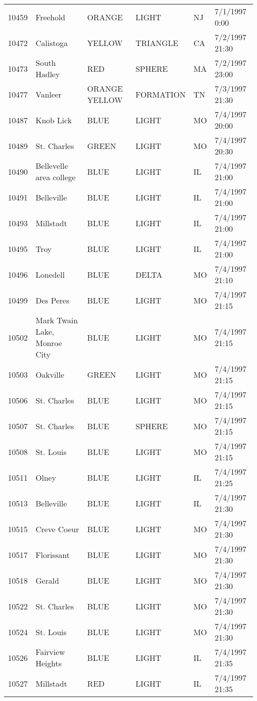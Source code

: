 \begin{tabular}{llllll}
10459 & Freehold & ORANGE & LIGHT & NJ & 7/1/1997 0:00 \\
10472 & Calistoga & YELLOW & TRIANGLE & CA & 7/2/1997 21:30 \\
10473 & South Hadley & RED & SPHERE & MA & 7/2/1997 23:00 \\
10477 & Vanleer & ORANGE YELLOW & FORMATION & TN & 7/3/1997 21:30 \\
10487 & Knob Lick & BLUE & LIGHT & MO & 7/4/1997 20:00 \\
10489 & St. Charles & GREEN & LIGHT & MO & 7/4/1997 20:30 \\
10490 & Bellevelle area college & BLUE & LIGHT & IL & 7/4/1997 21:00 \\
10491 & Belleville & BLUE & LIGHT & IL & 7/4/1997 21:00 \\
10493 & Millstadt & BLUE & LIGHT & IL & 7/4/1997 21:00 \\
10495 & Troy & BLUE & LIGHT & IL & 7/4/1997 21:00 \\
10496 & Lonedell & BLUE & DELTA & MO & 7/4/1997 21:10 \\
10499 & Des Peres & BLUE & LIGHT & MO & 7/4/1997 21:15 \\
10502 & Mark Twain Lake, Monroe City & BLUE & LIGHT & MO & 7/4/1997 21:15 \\
10503 & Oakville & GREEN & LIGHT & MO & 7/4/1997 21:15 \\
10506 & St. Charles & BLUE & LIGHT & MO & 7/4/1997 21:15 \\
10507 & St. Charles & BLUE & SPHERE & MO & 7/4/1997 21:15 \\
10508 & St. Louis & BLUE & LIGHT & MO & 7/4/1997 21:15 \\
10511 & Olney & BLUE & LIGHT & IL & 7/4/1997 21:25 \\
10513 & Belleville & BLUE & LIGHT & IL & 7/4/1997 21:30 \\
10515 & Creve Coeur & BLUE & LIGHT & MO & 7/4/1997 21:30 \\
10517 & Florissant & BLUE & LIGHT & MO & 7/4/1997 21:30 \\
10518 & Gerald & BLUE & LIGHT & MO & 7/4/1997 21:30 \\
10522 & St. Charles & BLUE & LIGHT & MO & 7/4/1997 21:30 \\
10524 & St. Louis & BLUE & LIGHT & MO & 7/4/1997 21:30 \\
10526 & Fairview Heights & BLUE & LIGHT & IL & 7/4/1997 21:35 \\
10527 & Millstadt & RED & LIGHT & IL & 7/4/1997 21:35 \\

\end{tabular}

